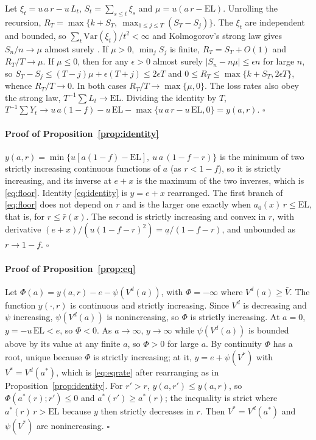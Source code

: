 \documentclass[preprint,11pt,authoryear]{elsarticle}
\theoremstyle{definition}
\newcommand{\EL}{\mathrm{EL}}
\begin{document}
Let $\xi_t=u\,a\,r-u\,L_t$, $S_t=\sum_{s\le t}\xi_s$ and $\mu=u(a\,r-\EL)$. Unrolling the recursion, $R_T=\max\{k+S_T,\ \max_{1\le j\le T}(S_T-S_j)\}$.
The $\xi_t$ are independent and bounded, so $\sum_t\mathrm{Var}(\xi_t)/t^2<\infty$ and Kolmogorov's strong law gives $S_n/n\to\mu$
almost surely \citep{billingsley1995}. If $\mu>0$, $\min_jS_j$ is finite, $R_T=S_T+O(1)$ and $R_T/T\to\mu$. If $\mu\le0$, then for any $\epsilon>0$ almost surely $|S_n-n\mu|\le\epsilon n$ for large $n$, so
$S_T-S_j\le(T-j)\mu+\epsilon(T+j)\le2\epsilon T$ and $0\le R_T\le\max\{k+S_T,2\epsilon T\}$, whence $R_T/T\to0$. In both cases $R_T/T\to\max\{\mu,0\}$. The loss rates also obey the strong law, $T^{-1}\sum L_t\to\EL$. Dividing the identity by $T$,
$T^{-1}\sum Y_t\to u\,a(1-f)-u\,\EL-\max\{u\,a\,r-u\,\EL,0\}=y(a,r)$. \hfill$\square$

\paragraph{Proof of Proposition~\ref{prop:identity}}
$y(a,r)=\min\{u[a(1-f)-\EL],\ u\,a\,(1-f-r)\}$ is the minimum of two strictly increasing continuous functions of $a$ (as $r<1-f$), so it is strictly increasing, and its inverse at $e+x$ is the maximum of the two inverses, which is \eqref{eq:floor}. Identity \eqref{eq:identity} is $y=e+x$ rearranged. The first branch of \eqref{eq:floor} does not depend on $r$ and is the larger one exactly when $a_0(x)\,r\le\EL$, that is, for $r\le\bar r(x)$. The second is strictly increasing and convex in $r$, with derivative $(e+x)/(u(1-f-r)^2)=\underline a/(1-f-r)$, and unbounded as $r\to1-f$. \hfill$\square$

\paragraph{Proof of Proposition~\ref{prop:eq}}
Let $\Phi(a)=y(a,r)-e-\psi(V^d(a))$, with $\Phi=-\infty$ where $V^d(a)\ge\bar V$. The function $y(\cdot,r)$ is continuous and strictly increasing. Since $V^d$ is decreasing and $\psi$ increasing, $\psi(V^d(a))$ is nonincreasing, so $\Phi$ is strictly increasing. At $a=0$, $y=-u\,\EL<e$, so $\Phi<0$. As $a\to\infty$, $y\to\infty$ while $\psi(V^d(a))$ is bounded above by its value at any finite $a$, so $\Phi>0$ for large $a$. By continuity $\Phi$ has a root, unique because $\Phi$ is strictly increasing; at it, $y=e+\psi(V^*)$ with $V^*=V^d(a^*)$, which is \eqref{eq:eqrate} after rearranging as in Proposition~\ref{prop:identity}. For $r'>r$, $y(a,r')\le y(a,r)$, so $\Phi(a^*(r);r')\le0$ and $a^*(r')\ge a^*(r)$; the inequality is strict where $a^*(r)\,r>\EL$ because $y$ then strictly decreases in $r$. Then $V^*=V^d(a^*)$ and $\psi(V^*)$ are nonincreasing. \hfill$\square$
\end{document}
